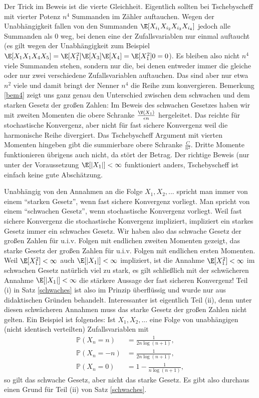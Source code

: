 Der Trick im Beweis ist die vierte Gleichheit. Eigentlich sollten bei Tschebyscheff mit vierter Potenz $n^4$ Summanden im Z\"ahler auftauchen. Wegen der Unabh\"angigkeit fallen von den Summanden $\E[X_{i_1}  X_{i_2}  X_{i_3}  X_{i_4}]$ jedoch alle Summanden als $0$ weg, bei denen eine der Zufallsvariablen nur einmal auftaucht (es gilt wegen der Unabh\"angigkeit zum Beispiel $\E[X_1 X_1 X_4X_5]=\E[X_1^2] \E[X_3]\E[X_4]=\E[X_1^2] 0=0$). Es bleiben also nicht $n^4$ viele Summanden stehen, sondern nur die, bei denen entweder immer die gleiche oder nur zwei verschiedene Zufallsvariablen auftauchen. Das sind aber nur etwa $n^2$ viele und damit bringt der Nenner $n^4$ die Reihe zum konvergieren. Bemerkung \ref{bem4} zeigt uns ganz genau den Unterschied zwischen dem schwachen und dem starken Gesetz der gro\ss en Zahlen: Im Beweis des schwachen Gesetzes haben wir mit zweiten Momenten die obere Schranke $\frac{\V(X_1)}{\epsilon n}$ hergeleitet. Das reichte f\"ur stochastische Konvergenz, aber nicht f\"ur fast sichere Konvergenz weil die harmonische Reihe divergiert. Das Tschebyscheff Argument mit vierten Momenten hingeben gibt die summierbare obere Schranke $\frac{C}{n^2}$.  Dritte Momente funktionieren \"ubrigens auch nicht, da st\"ort der Betrag. Der richtige Beweis (nur unter der Voraussetzung $\E[|X_1|]<\infty$ funktioniert anders, Tschebyscheff ist einfach keine gute Absch\"atzung.
\begin{bem}
Unabh\"angig von den Annahmen an die Folge $X_1, X_2, ...$ spricht man immer von einem \enquote{starken Gesetz}, wenn fast sichere Konvergenz vorliegt. Man spricht von einem \enquote{schwachen Gesetz}, wenn stochastische Konvergenz vorliegt. Weil fast sichere Konvergenz die stochastische Konvergenz impliziert, impliziert ein starkes Gesetz immer ein schwaches Gesetz. Wir haben also das schwache Gesetz der gro\ss en Zahlen f\"ur u.i.v. Folgen mit endlichen zweiten Momenten gezeigt, das starke Gesetz der gro\ss en Zahlen f\"ur u.i.v. Folgen mit endlichen ersten Momenten. Weil $\E[X_1^2]<\infty$ auch $\E[|X_1|]<\infty$ impliziert, ist die Annahme $\E[X_1^2]<\infty$ im schwachen Gesetz nat\"urlich viel zu stark, es gilt schlie\ss lich mit der schw\"acheren Annahme $\E[|X_1|]<\infty$ die st\"arkere Aussage der fast sicheren Konvergenz! Teil (i) in Satz \ref{schwaches} ist also im Prinzip \"uberfl\"ussig und wurde nur aus didaktischen Gr\"unden behandelt. Interessanter ist eigentlich Teil (ii), denn unter diesen schw\"acheren Annahmen muss das starke Gesetz der gro\ss en Zahlen nicht gelten. Ein Beispiel ist folgendes: Ist $X_1, X_2, ...$ eine Folge von unabh\"angigen (nicht identisch verteilten) Zufallsvariablen mit 
\begin{align*}
	\mathbb P(X_n=n)&=\frac{1}{2 n \log(n+1)},\\
	\mathbb P(X_n=-n)&=\frac{1}{2 n \log(n+1)},\\
	\mathbb P(X_n=0)&=1-\frac{1}{ n \log(n+1)},
\end{align*}
so gilt das schwache Gesetz, aber nicht das starke Gesetz. Es gibt also durchaus einen Grund f\"ur Teil (ii) von Satz \ref{schwaches}.
\end{bem}